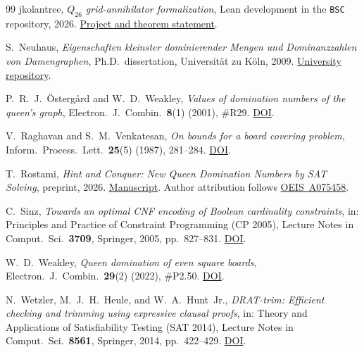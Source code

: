 \documentclass[11pt,a4paper]{article}
\theoremstyle{result}
\theoremstyle{definition}
\theoremstyle{remark}
\begin{document}
\begin{thebibliography}{99}
jkolantree,
\emph{$Q_{26}$ grid-annihilator formalization},
Lean development in the \texttt{BSC} repository, 2026.
\href{https://github.com/jkolantree/BSC/tree/main/formal/q26_grid_annihilator}{Project and theorem statement}.

S.~Neuhaus,
\emph{Eigenschaften kleinster dominierender Mengen und Dominanzzahlen von Damengraphen},
Ph.D.\ dissertation, Universit\"at zu K\"oln, 2009.
\href{https://kups.ub.uni-koeln.de/2916/}{University repository}.

P.~R.~J.~\"Osterg\aa rd and W.~D.~Weakley,
\emph{Values of domination numbers of the queen's graph},
Electron.\ J.\ Combin.\ \textbf{8}(1) (2001), \#R29.
\href{https://doi.org/10.37236/1573}{DOI}.

V.~Raghavan and S.~M.~Venkatesan,
\emph{On bounds for a board covering problem},
Inform.\ Process.\ Lett.\ \textbf{25}(5) (1987), 281--284.
\href{https://doi.org/10.1016/0020-0190(87)90201-8}{DOI}.

T.~Rostami,
\emph{Hint and Conquer: New Queen Domination Numbers by SAT Solving},
preprint, 2026.
\href{https://github.com/TahaRostami/Gamma/blob/hint-and-conquer/doc.pdf}{Manuscript}.
Author attribution follows \href{https://oeis.org/A075458}{OEIS~A075458}.

C.~Sinz,
\emph{Towards an optimal CNF encoding of Boolean cardinality constraints},
in: Principles and Practice of Constraint Programming (CP 2005),
Lecture Notes in Comput.\ Sci.\ \textbf{3709}, Springer, 2005,
pp.~827--831.
\href{https://doi.org/10.1007/11564751_73}{DOI}.

W.~D.~Weakley,
\emph{Queen domination of even square boards},
Electron.\ J.\ Combin.\ \textbf{29}(2) (2022), \#P2.50.
\href{https://doi.org/10.37236/10617}{DOI}.

N.~Wetzler, M.~J.~H.~Heule, and W.~A.~Hunt~Jr.,
\emph{DRAT-trim: Efficient checking and trimming using expressive clausal proofs},
in: Theory and Applications of Satisfiability Testing (SAT 2014),
Lecture Notes in Comput.\ Sci.\ \textbf{8561}, Springer, 2014,
pp.~422--429.
\href{https://doi.org/10.1007/978-3-319-09284-3_31}{DOI}.

\end{thebibliography}
\end{document}
